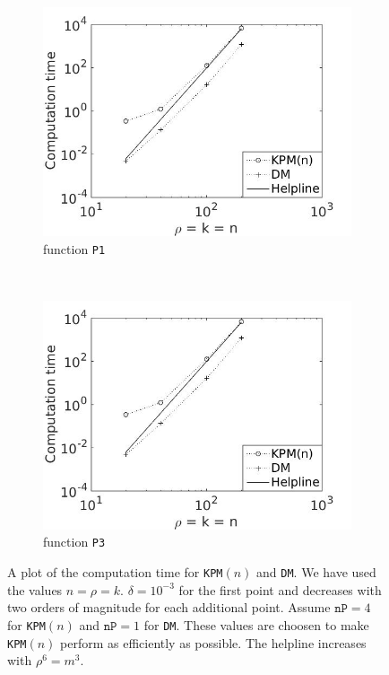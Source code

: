 \begin{figure}[H]
        \centering
        \begin{subfigure}[b]{0.45\textwidth}
                \includegraphics[width=\textwidth]{fig/comp2}
                \caption{function \texttt{P1}}
                \label{fig:c1comp1m}
        \end{subfigure}%
        ~
        \begin{subfigure}[b]{0.45\textwidth}
                \includegraphics[width=\textwidth]{fig/comp2}
                \caption{function \texttt{P3}}
                \label{fig:c2comp2m}
        \end{subfigure}
        \caption{A plot of the computation time for \texttt{KPM}$(n)$ and \texttt{DM}. We have used the values $n = \rho = k$. $\delta = 10^{-3}$ for the first point and decreases with two orders of magnitude for each additional point. Assume $\texttt{nP} = 4$ for \texttt{KPM}$(n)$ and $\texttt{nP} = 1$ for \texttt{DM}. These values are choosen to make \texttt{KPM}$(n)$ perform as efficiently as possible. The helpline increases with $\rho^6 = m^3$.}\label{fig:comp}
\end{figure}
